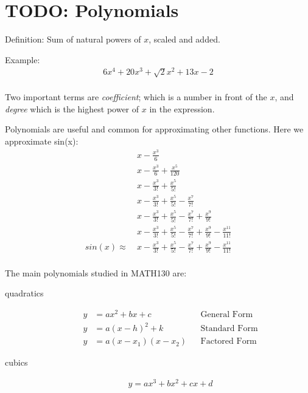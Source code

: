 \chapter{TODO: Polynomials}
\label{chap:Polynomials}
Definition: Sum of natural powers of $x$, scaled and added.

Example:
\begin{align}
  6x^4 + 20x^3 + \sqrt{2}x^2 + 13x - 2 \\
\end{align}

Two important terms are \emph{coefficient}; which is a number in front of the
$x$, and \emph{degree} which is the highest power of $x$ in the expression.

Polynomials are useful and common for approximating other functions. Here we
approximate sin(x):
\begin{align}
  &~ x - \frac{x^{3}}{6} \\
  &~ x - \frac{x^{3}}{6} + \frac{x^5}{120} \\
  &~ x - \frac{x^{3}}{3!} + \frac{x^5}{5!} \\
  &~ x - \frac{x^{3}}{3!} + \frac{x^5}{5!} - \frac{x^7}{7!} \\
  &~ x - \frac{x^{3}}{3!} + \frac{x^5}{5!} - \frac{x^7}{7!} + \frac{x^9}{9!} \\
  &~ x - \frac{x^{3}}{3!} + \frac{x^5}{5!} - \frac{x^7}{7!} + \frac{x^9}{9!} -
  \frac{x^11}{11!} \\
 sin(x) \approx &~ x - \frac{x^{3}}{3!} + \frac{x^5}{5!} - \frac{x^7}{7!} +
 \frac{x^9}{9!} - \frac{x^11}{11!} \\
\end{align}

The main polynomials studied in MATH130 are:
\begin{description}
  \item[quadratics]
    \begin{align}
      y & = ax^2 + bx + c       && \text{General Form} \\
      y & = a(x - h)^{2} + k    && \text{Standard Form} \\
      y & = a(x - x_1)(x - x_2) && \text{Factored Form}
    \end{align}
  \item[cubics]
    \begin{align}
      y = ax^3 + bx^2 + cx + d
    \end{align}
\end{description}

